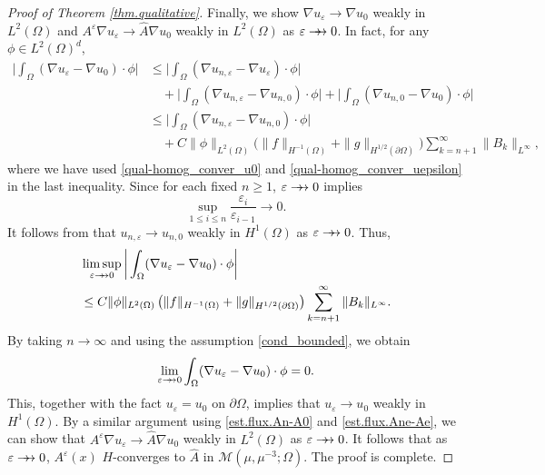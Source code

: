 \documentclass[reqno,12pt]{amsart} %
\theoremstyle{definition}
\theoremstyle{remark}
\numberwithin{equation}{section}
\newcommand{\e}{\varepsilon}
\newcommand{\doublerightarrow}{%
  \mathrel{%
    \mathchoice
      {\rightarrow\mspace{-10mu}\rightarrow} %
      {\rightarrow\mspace{-10mu}\rightarrow} %
      {\rightarrow\mspace{-10mu}\rightarrow} %
      {\rightarrow\mspace{-10mu}\rightarrow} %
  }%
}
\begin{document}
\begin{proof} [Proof of Theorem \ref{thm.qualitative}]
  Finally, we show $\nabla u_\e \to \nabla u_0$ weakly in $L^2(\Omega)$ and $A^\e \nabla u_\e \to \widehat{A} \nabla u_0$ weakly in $L^2(\Omega)$ as $\e \doublerightarrow 0$. In fact, for any $\phi \in L^2(\Omega)^d$,
  \begin{equation*}
  \begin{aligned}
      \bigg| \int_{\Omega} (\nabla u_\e - \nabla u_0) \cdot \phi \bigg| & \le \bigg| \int_{\Omega} (\nabla u_{n,\e} - \nabla u_\e) \cdot \phi \bigg| \\
      & \quad  + \bigg| \int_{\Omega} (\nabla u_{n,\e} - \nabla u_{n,0}) \cdot \phi \bigg| + \bigg| \int_{\Omega} (\nabla u_{n,0} - \nabla u_0) \cdot \phi \bigg| \\
      & \le \bigg| \int_{\Omega} (\nabla u_{n,\e} - \nabla u_{n,0}) \cdot \phi \bigg| \\
      & \quad + C\| \phi \|_{L^2(\Omega)} \Big(\| f\|_{H^{-1}(\Omega)} + \| g\|_{H^{1/2}(\partial \Omega)} \Big) \sum_{k=n+1}^\infty \|B_k\|_{L^\infty},
  \end{aligned}
  \end{equation*}
  where we have used \eqref{qual-homog_conver_u0} and \eqref{qual-homog_conver_uepsilon} in the last inequality.
  Since for each fixed $n\ge 1$, $\e \doublerightarrow 0$ implies
  \begin{equation*}
      \sup_{1\le i \le n} \frac{\e_i}{\e_{i-1}} \to 0.
  \end{equation*}
  It follows from \cite{Allaire1996Multiscale, Niu20_reiterated} that $u_{n,\e} \to u_{n,0}$ weakly in $H^1(\Omega)$ as $\e \doublerightarrow 0$. Thus, 
  \begin{align*}
      & \limsup_{\e \doublerightarrow 0} \bigg| \int_{\Omega} (\nabla u_\e - \nabla u_0) \cdot \phi \bigg| \\
      &\le C\| \phi \|_{L^2(\Omega)} \left(\| f\|_{H^{-1}(\Omega)} + \| g\|_{H^{1/2}(\partial \Omega)} \right) \sum_{k=n+1}^\infty \|B_k\|_{L^\infty}.
  \end{align*}
  By taking $n\to \infty$ and using the assumption \eqref{cond_bounded}, we obtain
  \begin{equation*}
      \lim_{\e \doublerightarrow 0} \int_{\Omega} (\nabla u_\e - \nabla u_0) \cdot \phi = 0.
  \end{equation*}
  This, together with the fact $u_\e = u_0$ on $\partial \Omega$, implies that $u_\e \to u_0$ weakly in $H^1(\Omega)$. By a similar argument using \eqref{est.flux.An-A0} and \eqref{est.flux.Ane-Ae}, we can show that $A^\e \nabla u_\e \to \widehat{A} \nabla u_0$ weakly in $L^2(\Omega)$ as $\e \doublerightarrow 0$. It follows  that as $\varepsilon\doublerightarrow 0$, $A^\varepsilon(x)$ $H$-converges to $\widehat{A}$ in $\mathcal{M}(\mu, \mu^{-3}; \Omega)$. The proof is complete.
\end{proof}
\end{document}
